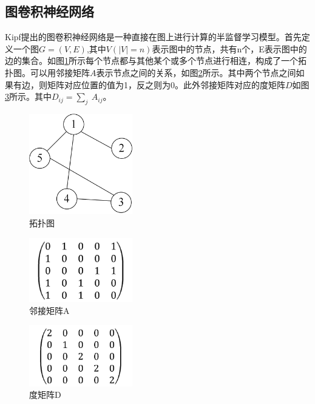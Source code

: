 \subsection{图卷积神经网络}
Kipf提出的图卷积神经网络是一种直接在图上进行计算的半监督学习模型。首先定义一个图$G=(V,E)$,其中$V\left(\left|V\right|=n\right)$表示图中的节点，共有n个，E表示图中的边的集合。如图\ref{topoFig}所示每个节点都与其他某个或多个节点进行相连，构成了一个拓扑图。可以用邻接矩阵$A$表示节点之间的关系，如图\ref{adjA}所示。其中两个节点之间如果有边，则矩阵对应位置的值为1，反之则为0。此外邻接矩阵对应的度矩阵$D$如图\ref{digD}所示。其中$D_{ij}=\sum_{j}\ A_{ij}$。
\begin{figure}[htb]%
	\setlength{\belowcaptionskip}{0pt}
	\centering
	\includegraphics[width=0.4\textwidth]{pic/2-6.png}
	\caption{拓扑图}
	\label{topoFig}
\end{figure}
\begin{figure}[htb]%
	\setlength{\belowcaptionskip}{0pt}
	\centering
	\includegraphics[width=0.4\textwidth]{pic/2-7.jpg}
	\caption{邻接矩阵A}
	\label{adjA}
\end{figure}
\begin{figure}[htb]%
	\setlength{\belowcaptionskip}{0pt}
	\centering
	\includegraphics[width=0.4\textwidth]{pic/2-8.jpg}
	\caption{度矩阵D}
	\label{digD}
\end{figure}

